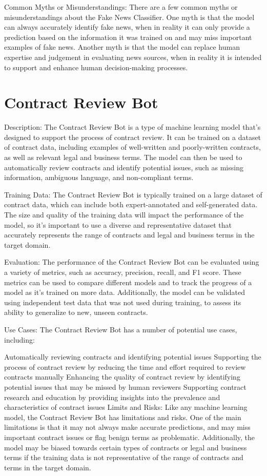 Common Myths or Misunderstandings:
There are a few common myths or misunderstandings about the Fake News Classifier. One myth is that the model can always accurately identify fake news, when in reality it can only provide a prediction based on the information it was trained on and may miss important examples of fake news. Another myth is that the model can replace human expertise and judgement in evaluating news sources, when in reality it is intended to support and enhance human decision-making processes.

\section{Contract Review Bot}

Description:
The Contract Review Bot is a type of machine learning model that's designed to support the process of contract review. It can be trained on a dataset of contract data, including examples of well-written and poorly-written contracts, as well as relevant legal and business terms. The model can then be used to automatically review contracts and identify potential issues, such as missing information, ambiguous language, and non-compliant terms.

Training Data:
The Contract Review Bot is typically trained on a large dataset of contract data, which can include both expert-annotated and self-generated data. The size and quality of the training data will impact the performance of the model, so it's important to use a diverse and representative dataset that accurately represents the range of contracts and legal and business terms in the target domain.

Evaluation:
The performance of the Contract Review Bot can be evaluated using a variety of metrics, such as accuracy, precision, recall, and F1 score. These metrics can be used to compare different models and to track the progress of a model as it's trained on more data. Additionally, the model can be validated using independent test data that was not used during training, to assess its ability to generalize to new, unseen contracts.

Use Cases:
The Contract Review Bot has a number of potential use cases, including:

Automatically reviewing contracts and identifying potential issues
Supporting the process of contract review by reducing the time and effort required to review contracts manually
Enhancing the quality of contract review by identifying potential issues that may be missed by human reviewers
Supporting contract research and education by providing insights into the prevalence and characteristics of contract issues
Limits and Risks:
Like any machine learning model, the Contract Review Bot has limitations and risks. One of the main limitations is that it may not always make accurate predictions, and may miss important contract issues or flag benign terms as problematic. Additionally, the model may be biased towards certain types of contracts or legal and business terms if the training data is not representative of the range of contracts and terms in the target domain.

